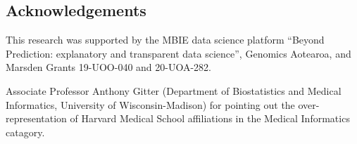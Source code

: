 \documentclass[fleqn,10pt,doc,onecolumn]{SelfArx}%
\begin{document}




\subsection*{Acknowledgements}

  This research was supported by the MBIE data
science platform ``Beyond Prediction: explanatory and transparent data
science'', Genomics Aotearoa, and Marsden
Grants 19-UOO-040 and 20-UOA-282.

Associate Professor Anthony Gitter (Department of Biostatistics and
Medical Informatics, University of Wisconsin-Madison) for pointing out
the over-representation of Harvard Medical School affiliations in the
Medical Informatics catagory.




\end{document}
